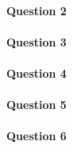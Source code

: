\documentclass[a4paper]{article}
\begin{document}
\paragraph{Question 2}

\paragraph{Question 3}

\paragraph{Question 4}

\paragraph{Question 5}

\paragraph{Question 6}
\end{document}
